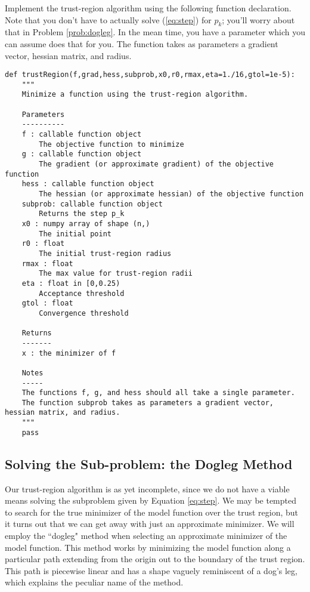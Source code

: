 \begin{problem}
Implement the trust-region algorithm using the following function declaration.  Note that you don't have to actually solve (\ref{eq:step}) for $p_k$; you'll worry about that in Problem \ref{prob:dogleg}. In the mean time, you have a parameter  which you can assume does that for you. The function  takes as parameters a gradient vector, hessian matrix, and radius.
\begin{lstlisting}
def trustRegion(f,grad,hess,subprob,x0,r0,rmax,eta=1./16,gtol=1e-5):
    """
    Minimize a function using the trust-region algorithm.

    Parameters
    ----------
    f : callable function object
        The objective function to minimize
    g : callable function object
        The gradient (or approximate gradient) of the objective function
    hess : callable function object
        The hessian (or approximate hessian) of the objective function
    subprob: callable function object
        Returns the step p_k
    x0 : numpy array of shape (n,)
        The initial point
    r0 : float
        The initial trust-region radius
    rmax : float
        The max value for trust-region radii
    eta : float in [0,0.25)
        Acceptance threshold
    gtol : float
        Convergence threshold

    Returns
    -------
    x : the minimizer of f

    Notes
    -----
    The functions f, g, and hess should all take a single parameter.
    The function subprob takes as parameters a gradient vector, hessian matrix, and radius.
    """
    pass
\end{lstlisting}
\end{problem}

\subsection*{Solving the Sub-problem: the Dogleg Method}
Our trust-region algorithm is as yet incomplete, since we do not have a viable means solving the subproblem
given by Equation \ref{eq:step}.
We may be tempted to search for the true minimizer of the model function over the trust region, but it turns out
that we can get away with just an approximate minimizer.
We will employ the ``dogleg" method when selecting an approximate minimizer of the model function.
This method works by minimizing the model function along a particular path extending from the origin out
to the boundary of the trust region.
This path is piecewise linear and has a shape vaguely reminiscent of a dog's leg, which explains the peculiar name of the method.

